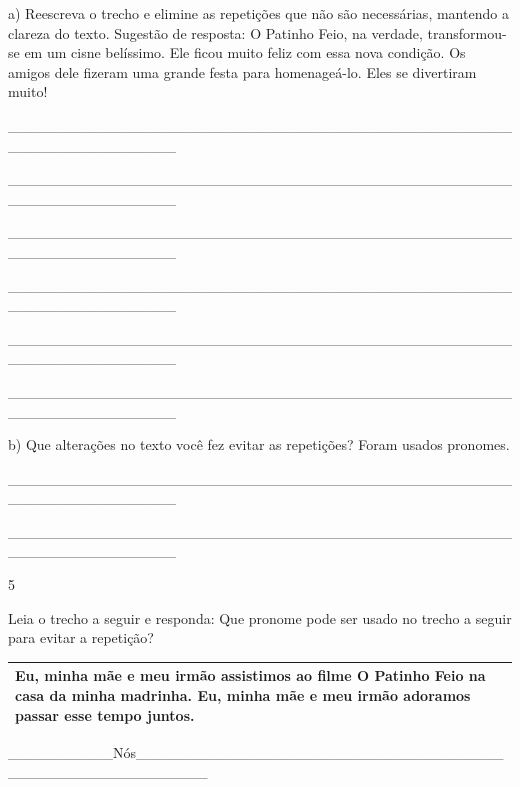 \begin{escolha}
a) Reescreva o trecho e elimine as repetições que não são necessárias,
mantendo a clareza do texto. Sugestão de resposta: O Patinho Feio, na
verdade, transformou-se em um cisne belíssimo. Ele ficou muito feliz com
essa nova condição. Os amigos dele fizeram uma grande festa para
homenageá-lo. Eles se divertiram muito!

\_\_\_\_\_\_\_\_\_\_\_\_\_\_\_\_\_\_\_\_\_\_\_\_\_\_\_\_\_\_\_\_\_\_\_\_\_\_\_\_\_\_\_\_\_\_\_\_\_\_\_\_\_\_\_\_\_\_\_\_\_\_\_\_

\_\_\_\_\_\_\_\_\_\_\_\_\_\_\_\_\_\_\_\_\_\_\_\_\_\_\_\_\_\_\_\_\_\_\_\_\_\_\_\_\_\_\_\_\_\_\_\_\_\_\_\_\_\_\_\_\_\_\_\_\_\_\_\_

\_\_\_\_\_\_\_\_\_\_\_\_\_\_\_\_\_\_\_\_\_\_\_\_\_\_\_\_\_\_\_\_\_\_\_\_\_\_\_\_\_\_\_\_\_\_\_\_\_\_\_\_\_\_\_\_\_\_\_\_\_\_\_\_

\_\_\_\_\_\_\_\_\_\_\_\_\_\_\_\_\_\_\_\_\_\_\_\_\_\_\_\_\_\_\_\_\_\_\_\_\_\_\_\_\_\_\_\_\_\_\_\_\_\_\_\_\_\_\_\_\_\_\_\_\_\_\_\_

\_\_\_\_\_\_\_\_\_\_\_\_\_\_\_\_\_\_\_\_\_\_\_\_\_\_\_\_\_\_\_\_\_\_\_\_\_\_\_\_\_\_\_\_\_\_\_\_\_\_\_\_\_\_\_\_\_\_\_\_\_\_\_\_

\_\_\_\_\_\_\_\_\_\_\_\_\_\_\_\_\_\_\_\_\_\_\_\_\_\_\_\_\_\_\_\_\_\_\_\_\_\_\_\_\_\_\_\_\_\_\_\_\_\_\_\_\_\_\_\_\_\_\_\_\_\_\_\_

b) Que alterações no texto você fez evitar as repetições? Foram usados
pronomes.

\_\_\_\_\_\_\_\_\_\_\_\_\_\_\_\_\_\_\_\_\_\_\_\_\_\_\_\_\_\_\_\_\_\_\_\_\_\_\_\_\_\_\_\_\_\_\_\_\_\_\_\_\_\_\_\_\_\_\_\_\_\_\_\_

\_\_\_\_\_\_\_\_\_\_\_\_\_\_\_\_\_\_\_\_\_\_\_\_\_\_\_\_\_\_\_\_\_\_\_\_\_\_\_\_\_\_\_\_\_\_\_\_\_\_\_\_\_\_\_\_\_\_\_\_\_\_\_\_

\num{5}

Leia o trecho a seguir e responda: Que pronome pode ser usado no trecho
a seguir para evitar a repetição?

\begin{longtable}[]{@{}l@{}}
\toprule
Eu, minha mãe e meu irmão assistimos ao filme O Patinho Feio na casa da
minha madrinha. \textbf{Eu, minha mãe e meu irmão} adoramos passar esse
tempo juntos.\tabularnewline
\bottomrule
\end{longtable}

\_\_\_\_\_\_\_\_\_\_Nós\_\_\_\_\_\_\_\_\_\_\_\_\_\_\_\_\_\_\_\_\_\_\_\_\_\_\_\_\_\_\_\_\_\_\_\_\_\_\_\_\_\_\_\_\_\_\_\_\_\_\_\_\_\_



\end{escolha}

